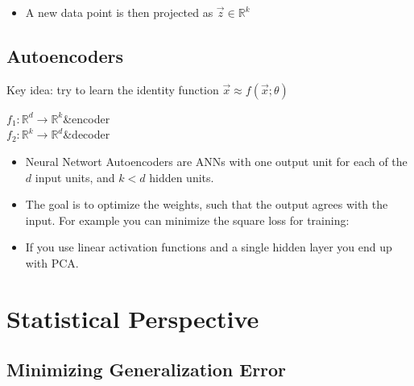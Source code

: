 \documentclass[10pt,a4paper]{scrartcl}
\begin{document}
\begin{multicols*}{2}
\begin{itemize}


\item A new data point is then projected as $\vec{z}\in\mathbb{R}^k$

\end{itemize}

\subsection{Autoencoders}

Key idea: try to learn the identity function $\vec{x}\approx f(\vec{x};\theta)$


\begin{TDefinitionTable*}
$f_1:\mathbb{R}^d\rightarrow\mathbb{R}^k$&encoder\\
$f_2:\mathbb{R}^k\rightarrow\mathbb{R}^d$&decoder\\
\end{TDefinitionTable*}

\begin{itemize}
\item Neural Networt Autoencoders are ANNs with one output unit for each of the $d$ input units, and $k<d$ hidden units.
\item The goal is to optimize the weights, such that the output agrees with the input. For example you can minimize the square loss for training:

\item If you use linear activation functions and a single hidden layer you end up with PCA.
\end{itemize}

\section{Statistical Perspective}

\subsection{Minimizing Generalization Error}


\end{multicols*}
\end{document}

